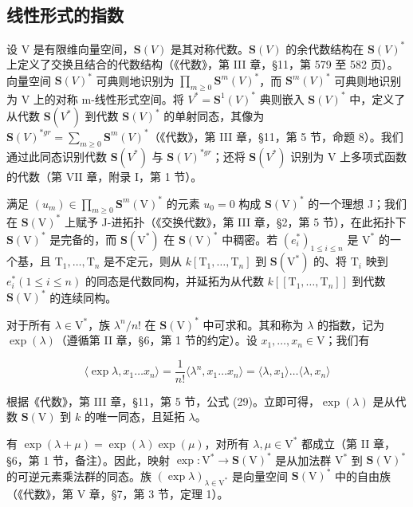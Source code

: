 \subsection{线性形式的指数}

设 V 是有限维向量空间，\(\mathbf{S}(V)\) 是其对称代数。\(\mathbf{S}(V)\) 的余代数结构在 \(\mathbf{S}(V)^{*}\) 上定义了交换且结合的代数结构（《代数》，第 III 章，§11，第 579 至 582 页）。向量空间 \(\mathbf{S}(V)^{*}\) 可典则地识别为 \(\prod_{m\geq0}\mathbf{S}^{m}(V)^{*}\)，而 \(\mathbf{S}^{m}(V)^{*}\) 可典则地识别为 V 上的对称 m-线性形式空间。将 \(V^{*}=\mathbf{S}^{1}(V)^{*}\) 典则嵌入 \(\mathbf{S}(V)^{*}\) 中，定义了从代数 \(\mathbf{S}(V^{*})\) 到代数 \(\mathbf{S}(V)^{*}\) 的单射同态，其像为 \(\mathbf{S}(V)^{*gr}=\sum_{m\geq0}\mathbf{S}^{m}(V)^{*}\)（《代数》，第 III 章，§11，第 5 节，命题 8）。我们通过此同态识别代数 \(\mathbf{S}(V^{*})\) 与 \(\mathbf{S}(V)^{*gr}\)；还将 \(\mathbf{S}(V^{*})\) 识别为 V 上多项式函数的代数（第 VII 章，附录 I，第 1 节）。

满足 \((u_m) \in \prod_{m \geq 0} \mathbf{S}^m(\mathrm{V})^*\) 的元素 \(u_0 = 0\) 构成 \(\mathbf{S}(\mathrm{V})^*\) 的一个理想 J；我们在 \(\mathbf{S}(\mathrm{V})^*\) 上赋予 J-进拓扑（《交换代数》，第 III 章，§2，第 5 节），在此拓扑下 \(\mathbf{S}(\mathrm{V})^*\) 是完备的，而 \(\mathbf{S}(\mathrm{V}^*)\) 在 \(\mathbf{S}(\mathrm{V})^*\) 中稠密。若 \((e_i^*)_{1 \leq i \leq n}\) 是 \(\mathrm{V}^*\) 的一个基，且 \(\mathrm{T}_1, \ldots, \mathrm{T}_n\) 是不定元，则从 \(k[\mathrm{T}_1, \ldots, \mathrm{T}_n]\) 到 \(\mathbf{S}(\mathrm{V}^*)\) 的、将 \(\mathrm{T}_i\) 映到 \(e_i^*(1 \leq i \leq n)\) 的同态是代数同构，并延拓为从代数 \(k[[\mathrm{T}_1, \ldots, \mathrm{T}_n]]\) 到代数 \(\mathbf{S}(\mathrm{V})^*\) 的连续同构。

对于所有 \(\lambda \in \mathrm{V}^*\)，族 \(\lambda^n / n!\) 在 \(\mathbf{S}(\mathrm{V})^*\) 中可求和。其和称为 \(\lambda\) 的指数，记为 \(\exp(\lambda)\)（遵循第 II 章，§6，第 1 节的约定）。设 \(x_1, \ldots, x_n \in \mathrm{V}\)；我们有

\[
\langle \exp \lambda , x _ {1} \dots x _ {n} \rangle = \frac {1}{n !} \langle \lambda^ {n}, x _ {1} \dots x _ {n} \rangle = \langle \lambda , x _ {1} \rangle \dots \langle \lambda , x _ {n} \rangle
\]

根据《代数》，第 III 章，§11，第 5 节，公式 (29)。立即可得，\(\exp(\lambda)\) 是从代数 \(\mathbf{S}(\mathrm{V})\) 到 \(k\) 的唯一同态，且延拓 \(\lambda\)。

有 \(\exp (\lambda +\mu) = \exp (\lambda)\exp (\mu)\)，对所有 \(\lambda ,\mu \in \mathrm{V}^{*}\) 都成立（第 II 章，§6，第 1 节，备注）。因此，映射 \(\exp :\mathrm{V}^{*}\to \mathbf{S}(\mathrm{V})^{*}\) 是从加法群 \(\mathrm{V}^*\) 到 \(\mathbf{S}(\mathrm{V})^{*}\) 的可逆元素乘法群的同态。族 \((\exp \lambda)_{\lambda \in \mathrm{V}^{*}}\) 是向量空间 \(\mathbf{S}(\mathrm{V})^{*}\) 中的自由族（《代数》，第 V 章，§7，第 3 节，定理 1）。

